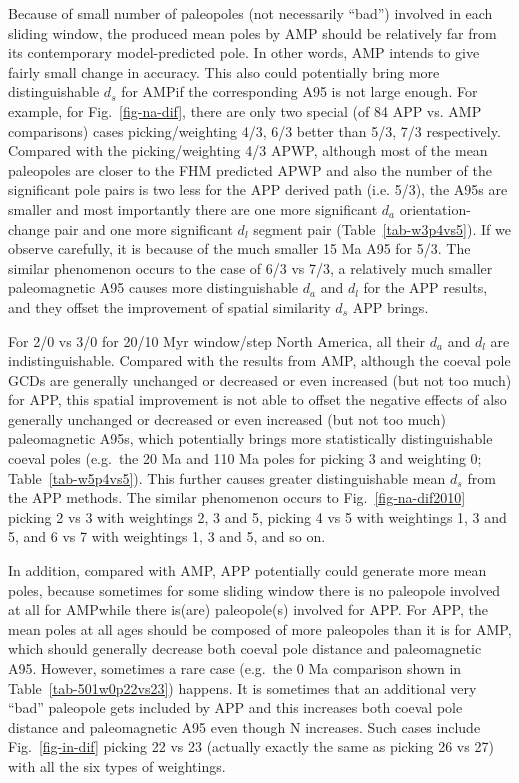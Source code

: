 Because of small number of paleopoles (not necessarily ``bad'') involved in
each sliding window, the produced mean poles by AMP should be relatively far
from its contemporary model-predicted pole. In other words, AMP intends to give
fairly small change in accuracy. This also could potentially bring more
distinguishable $d_s$ for AMP\@ if the corresponding A95 is not large enough.
For example, for Fig.~\ref{fig-na-dif}, there are only two special (of 84 APP
vs. AMP comparisons) cases picking/weighting 4/3, 6/3 better than 5/3, 7/3
respectively. Compared with the picking/weighting 4/3 APWP, although most of the
mean paleopoles are closer to the FHM predicted APWP and also the number of the
significant pole pairs is two less for the APP derived path (i.e. 5/3), the A95s
are smaller and most importantly there are one more significant $d_a$
orientation-change pair and one more significant $d_l$ segment pair
(Table~\ref{tab-w3p4vs5}). If we observe carefully, it is because of the much
smaller 15 Ma A95 for 5/3. The similar phenomenon occurs to the case of 6/3 vs
7/3, a relatively much smaller paleomagnetic A95 causes more distinguishable
$d_a$ and $d_l$ for the APP results, and they offset the improvement of spatial
similarity $d_s$ APP brings.

For 2/0 vs 3/0 for 20/10 Myr window/step North America, all their $d_a$ and
$d_l$ are indistinguishable. Compared with the results from AMP, although the
coeval pole GCDs are generally unchanged or decreased or even increased (but not
too much) for APP, this spatial improvement is not able to offset the negative
effects of also generally unchanged or decreased or even increased (but not too
much) paleomagnetic A95s, which potentially brings more statistically
distinguishable coeval poles (e.g.\ the 20 Ma and 110 Ma poles for picking 3 and
weighting 0; Table~\ref{tab-w5p4vs5}). This further causes greater
distinguishable mean $d_s$ from the APP methods. The similar phenomenon occurs
to Fig.~\ref{fig-na-dif2010} picking 2 vs 3 with weightings 2, 3 and 5, picking
4 vs 5 with weightings 1, 3 and 5, and 6 vs 7 with weightings 1, 3 and 5, and
so on.

In addition, compared with AMP, APP potentially could generate more mean poles,
because sometimes for some sliding window there is no paleopole involved at all
for AMP\@ while there is(are) paleopole(s) involved for APP\@. For APP, the
mean poles at all ages should be composed of more paleopoles than it is for
AMP, which should generally decrease both coeval pole distance and paleomagnetic
A95. However, sometimes a rare case (e.g.\ the 0 Ma comparison shown in
Table~\ref{tab-501w0p22vs23}) happens. It is sometimes that an additional
very ``bad'' paleopole gets included by APP and this increases both coeval pole
distance and paleomagnetic A95 even though N increases. Such cases include
Fig.~\ref{fig-in-dif} picking 22 vs 23 (actually exactly the same as picking 26
vs 27) with all the six types of weightings.


